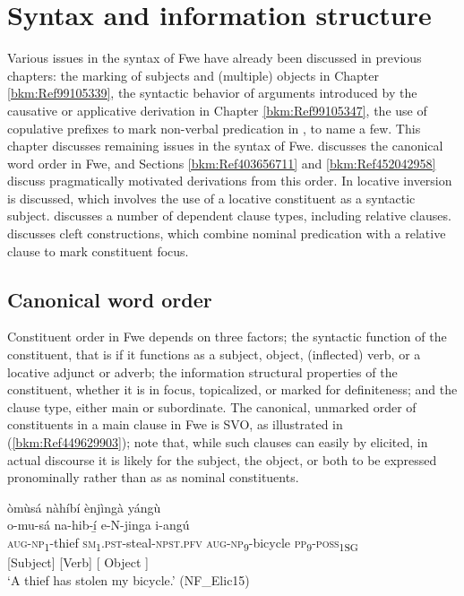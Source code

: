 \chapter{Syntax and information structure}
\label{bkm:Ref99093567}\hypertarget{Toc75352711}{}
Various issues in the syntax of Fwe have already been discussed in previous chapters: the marking of subjects and (multiple) objects in Chapter \ref{bkm:Ref99105339}, the syntactic behavior of arguments introduced by the causative or applicative derivation in Chapter \ref{bkm:Ref99105347}, the use of copulative prefixes to mark non-verbal predication in , to name a few. This chapter discusses remaining issues in the syntax of Fwe.  discusses the canonical word order in Fwe, and Sections \ref{bkm:Ref403656711} and \ref{bkm:Ref452042958} discuss pragmatically motivated derivations from this order. In  locative inversion is discussed, which involves the use of a locative constituent as a syntactic subject.  discusses a number of dependent clause types, including relative clauses.  discusses cleft constructions, which combine nominal predication with a relative clause to mark constituent focus.

\section{Canonical word order}
\label{bkm:Ref492315922}\label{bkm:Ref492308543}\hypertarget{Toc75352712}{}\label{bkm:Ref492317959}
Constituent order in Fwe depends on three factors; the syntactic function of the constituent, that is if it functions as a subject, object, (inflected) verb, or a locative adjunct or adverb; the information structural properties of the constituent, whether it is in focus, topicalized, or marked for definiteness; and the clause type, either main or subordinate. The canonical, unmarked order of constituents in a main clause in Fwe is SVO, as illustrated in (\ref{bkm:Ref449629903}); note that, while such clauses can easily by elicited, in actual discourse it is likely for the subject, the object, or both to be expressed pronominally rather than as as nominal constituents.

\ea
\label{bkm:Ref449629903}
òmùsá nàhíbí ènjìngà yángù\\
\glll o-mu-sá    na-hib-í̲      e-N-jinga    i-angú\\
\textsc{aug}-\textsc{np}\textsubscript{1}-thief  \textsc{sm}\textsubscript{1}.\textsc{pst}-steal-\textsc{npst}.\textsc{pfv}  \textsc{aug}-\textsc{np}\textsubscript{9}-bicycle  \textsc{pp}\textsubscript{9}-\textsc{poss}\textsubscript{1SG}\\
{}[Subject]    [Verb]        {[    Object  ]}\\
\glt ‘A thief has stolen my bicycle.’ (NF\_Elic15)
\z


